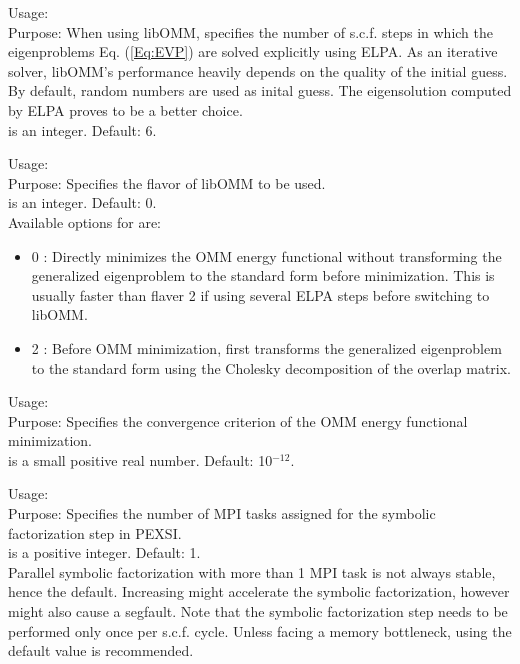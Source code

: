 {
  \noindent
  Usage:   \\[1.0ex]
  Purpose: When using libOMM, specifies the number of s.c.f. steps in which the
    eigenproblems Eq. (\ref{Eq:EVP}) are solved explicitly using ELPA. As an
    iterative solver, libOMM's performance heavily depends on the quality of the
    initial guess. By default, random numbers are used as inital guess. The
    eigensolution computed by ELPA proves to be a better choice. \\[1.0ex]
   is an integer. Default: 6. \\
}

{
  \noindent
  Usage:   \\[1.0ex]
  Purpose: Specifies the flavor of libOMM to be used. \\[1.0ex]
   is an integer. Default: 0. \\
}
Available options for  are:
\begin{itemize}
  \item 0 : Directly minimizes the OMM energy functional without transforming
    the generalized eigenproblem to the standard form before minimization. This
    is usually faster than flaver 2 if using several ELPA steps before switching
    to libOMM.
  \item 2 : Before OMM minimization, first transforms the generalized
    eigenproblem to the standard form using the Cholesky decomposition of the
    overlap matrix.
\end{itemize}

{
  \noindent
  Usage:   \\[1.0ex]
  Purpose: Specifies the convergence criterion of the OMM energy functional
    minimization. \\[1.0ex]
   is a small positive real number. Default: 10$^{-12}$. \\
}

{
  \noindent
  Usage:   \\[1.0ex]
  Purpose: Specifies the number of MPI tasks assigned for the symbolic
    factorization step in PEXSI. \\[1.0ex]
   is a positive integer. Default: 1. \\
}
Parallel symbolic factorization with more than 1 MPI task is not always stable,
hence the default. Increasing  might accelerate the symbolic
factorization, however might also cause a segfault. Note that the symbolic
factorization step needs to be performed only once per s.c.f. cycle. Unless
facing a memory bottleneck, using the default value is recommended.

